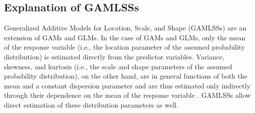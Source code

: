 \subsection{Explanation of GAMLSSs}

Generalized Additive Models for Location, Scale, and Shape (GAMLSSs) \parencite{Rigby2001,Akanztiliotou2002,Rigby2005} are an extension of GAMs and GLMs.  In the case of GAMs and GLMs, only the mean of the response variable (i.e., the location parameter of the assumed probability distribution) is estimated directly from the predictor variables.  Variance, skewness, and kurtosis (i.e., the scale and shape parameters of the assumed probability distribution), on the other hand, are in general functions of both the mean and a constant dispersion parameter and are thus estimated only indirectly through their dependence on the mean of the response variable \parencite{Rigby2001}.  GAMLSSs allow direct estimation of these distribution parameters as well.

